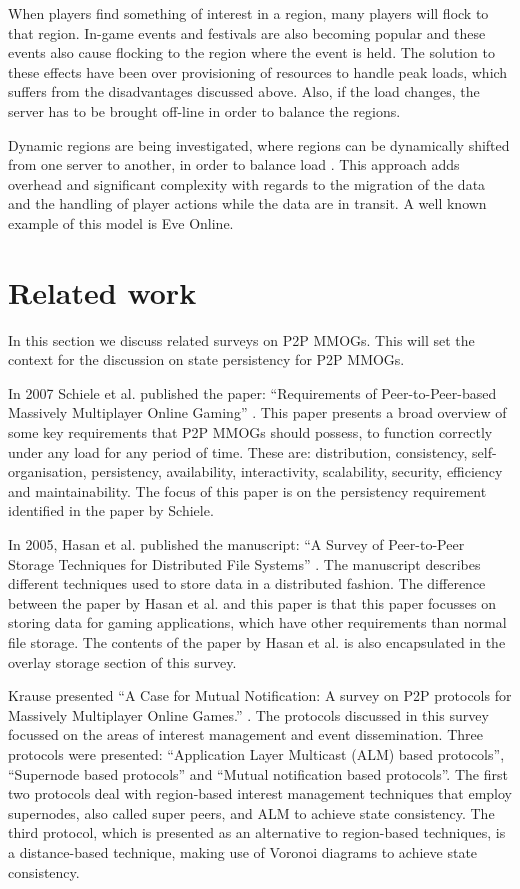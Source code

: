 \documentclass[10pt,a4paper,journal,cspaper,compsoc]{IEEEtran}
\begin{document}
When players find something of interest in a region, many players will flock to that region. In-game events and festivals are also becoming popular
and these events also cause flocking to the region where the event is held. The solution to these effects have been over provisioning of resources to
handle peak loads, which suffers from the disadvantages discussed above. Also, if the load changes, the server has to be brought off-line in order to
balance the regions.

Dynamic regions are being investigated, where regions can be dynamically shifted from one server to another, in order to balance load
\cite{zone_based_dyn}. This approach adds overhead and significant complexity with regards to the migration of the data and the handling of player
actions while the data are in transit. A well known example of this model is Eve Online.

\section{Related work}
\label{related_work}

In this section we discuss related surveys on P2P MMOGs. This will set the context for the discussion on state persistency for P2P MMOGs.

In 2007 Schiele et al. published the paper: ``Requirements of Peer-to-Peer-based Massively Multiplayer Online Gaming''
\cite{Schiele_p2p_requirements}. This paper presents a broad overview of some key requirements that P2P MMOGs should possess, to function correctly
under any load for any period of time. These are: distribution, consistency, self-organisation, persistency, availability, interactivity,
scalability, security, efficiency and maintainability. The focus of this paper is on the persistency requirement identified in the paper by Schiele.

In 2005, Hasan et al. published the manuscript: ``A Survey of Peer-to-Peer Storage Techniques for Distributed File Systems''
\cite{Hasan_distributed_storage_survey}. The manuscript describes different techniques used to store data in a distributed fashion. The difference
between the paper by Hasan et al. and this paper is that this paper focusses on storing data for gaming applications, which have other requirements
than normal file storage. The contents of the paper by Hasan et al. is also encapsulated in the overlay storage section of this survey.

Krause presented ``A Case for Mutual Notification: A survey on P2P protocols for Massively Multiplayer Online Games.''
\cite{IM_and_ED_survey_Krause}. The protocols discussed in this survey focussed on the areas of interest management and event dissemination. Three
protocols were presented: ``Application Layer Multicast (ALM) based protocols'', ``Supernode based protocols'' and ``Mutual notification based
protocols''. The first two protocols deal with region-based interest management techniques that employ supernodes, also called super peers, and ALM
to achieve state consistency. The third protocol, which is presented as an alternative to region-based techniques, is a distance-based technique,
making use of Voronoi diagrams to achieve state consistency.
\end{document}
